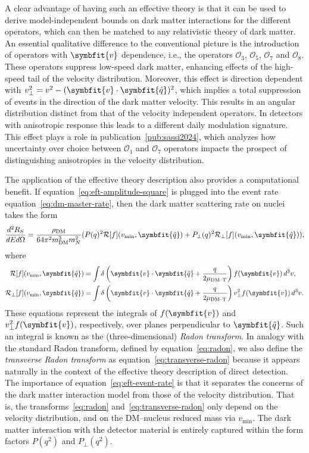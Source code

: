 \documentclass[b5paper, 10pt, twoside]{book}
\renewcommand{\vec}[1]{\symbfit{#1}}
\newcommand{\ddder}[3]{\frac{d^2#1}{d#2d#3}}
\newcommand{\unitv}[1]{\symbfit{\hat{#1}}}
\newcommand{\difd}{\,d}
\begin{document}
A clear advantage of having such an effective theory is that it can be used to derive model-independent bounds on dark matter interactions for the different operators, which can then be matched to any relativistic theory of dark matter. An essential qualitative difference to the conventional picture is the introduction of operators with $\vec{v}$ dependence, i.e., the operators $\mathcal{O}_3$, $\mathcal{O}_5$, $\mathcal{O}_7$ and $\mathcal{O}_8$. These operators suppress low-speed dark matter, enhancing effects of the high-speed tail of the velocity distribution. Moreover, this effect is direction dependent with $v_\perp^2=v^2-(\vec{v}\cdot\unitv{q})^2$, which implies a total suppression of events in the direction of the dark matter velocity. This results in an angular distribution distinct from that of the velocity independent operators. In detectors with anisotropic response this leads to a different daily modulation signature. This effect plays a role in publication~\ref{pub:sassi2024}, which analyzes how uncertainty over choice between $\mathcal{O}_1$ and $\mathcal{O}_7$ operators impacts the prospect of distinguishing anisotropies in the velocity distribution.

The application of the effective theory description also provides a computational benefit. If equation~\eqref{eq:eft-amplitude-square} is plugged into the event rate equation~\eqref{eq:dm-master-rate}, then the dark matter scattering rate on nuclei takes the form
\begin{equation}
    \ddder{R_S}{E}{\Omega}=\frac{\rho_\text{DM}}{64\pi^2m_\text{DM}^3m_N^2}(P(q)^2\mathcal{R}[f](v_\text{min},\unitv{q})+P_\perp(q)^2\mathcal{R}_\perp[f](v_\text{min},\unitv{q})),
    \label{eq:eft-event-rate}
\end{equation}
where
\begin{align}
    \label{eq:radon}
    \mathcal{R}[f](v_\text{min},\unitv{q})&=\int\delta\left(\vec{v}\cdot\unitv{q}+\frac{q}{2\mu_\text{DM--T}}\right)f(\vec{v})\difd^3v,\\
    \label{eq:transverse-radon}
    \mathcal{R}_\perp[f](v_\text{min},\unitv{q})&=\int\delta\left(\vec{v}\cdot\unitv{q}+\frac{q}{2\mu_\text{DM--T}}\right)v_\perp^2f(\vec{v})\difd^3v.
\end{align}
These equations represent the integrals of $f(\vec{v})$ and $v_\perp^2f(\vec{v})$, respectively, over planes perpendicular to $\unitv{q}$. Such an integral is known as the (three-dimensional) \emph{Radon transform}. In analogy with the standard Radon transform, defined by equation~\eqref{eq:radon}, we also define the \emph{transverse Radon transform} as equation~\eqref{eq:transverse-radon} because it appears naturally in the context of the effective theory description of direct detection. The importance of equation~\eqref{eq:eft-event-rate} is that it separates the concerns of the dark matter interaction model from those of the velocity distribution. That is, the transforms~\eqref{eq:radon} and~\eqref{eq:transverse-radon} only depend on the velocity distribution, and on the DM--nucleus reduced mass via $v_\text{min}$. The dark matter interaction with the detector material is entirely captured within the form factors $P(q^2)$ and $P_\perp(q^2)$.
\end{document}
